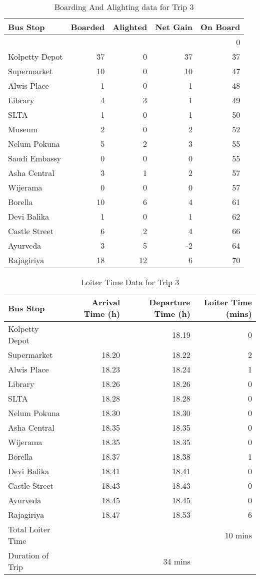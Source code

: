 \begin{table}
\centering
\begin{tabular}{|l|r|r|r|r|}
\hline
Bus Stop & Boarded & Alighted & Net Gain & On Board \\
\hline
 & & & & 0 \\
Kolpetty Depot	&37	&0	&37	&37\\
Supermarket	&10	&0	&10	&47\\
Alwis Place	&1	&0	&1	&48\\
Library	&4	&3	&1	&49\\
SLTA	&1	&0	&1	&50\\
\rowcolor[gray]{0.7}
Museum	&2	&0	&2	&52\\
Nelum Pokuna	&5	&2	&3	&55\\
Saudi Embassy	&0	&0	&0	&55\\
Asha Central	&3	&1	&2	&57\\
Wijerama	&0	&0	&0	&57\\
Borella	&10	&6	&4	&61\\
Devi Balika	&1	&0	&1	&62\\
Castle Street	&6	&2	&4	&66\\
Ayurveda	&3	&5	&-2	&64\\
Rajagiriya	&18	&12	&6	&70\\
\hline
\end{tabular}
\caption{Boarding And Alighting data for Trip 3}
\label{table-trip3-BoardingAndAlighting}
\end{table}

\begin{table}
\centering
\begin{tabular}{|l|r|r|r|}
\hline
Bus Stop & Arrival Time (h) & Departure Time (h) & Loiter Time (mins) \\
\hline
Kolpetty Depot	&	&18.19	&0\\
Supermarket	&18.20	&18.22	&2\\
Alwis Place	&18.23	&18.24	&1\\
Library	&18.26	&18.26	&0\\
SLTA	&18.28	&18.28	&0\\
Nelum Pokuna	&18.30	&18.30	&0\\
Asha Central	&18.35	&18.35	&0\\
Wijerama	&18.35	&18.35	&0\\
Borella	&18.37	&18.38	&1\\
Devi Balika	&18.41	&18.41	&0\\
Castle Street	&18.43	&18.43	&0\\
Ayurveda	&18.45	&18.45	&0\\
Rajagiriya	&18.47	&18.53	&6\\
\hline
Total Loiter Time & & & 10 mins \\
Duration of Trip & & 34 mins & \\
\hline
\end{tabular}
\caption{Loiter Time Data for Trip 3}
\label{table-trip3-LoiterTime}
\end{table}

